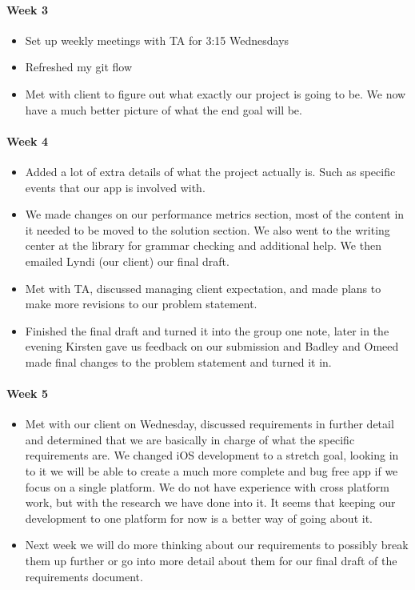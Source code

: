 \documentclass[onecolumn, draftclsnofoot,10pt, compsoc]{IEEEtran}
\begin{document}
      \paragraph{Week 3}
        \begin{itemize}
          \item Set up weekly meetings with TA for 3:15 Wednesdays
          \item Refreshed my git flow
          \item Met with client to figure out what exactly our project is going to be. We now have a much better picture of what the end goal will be.
        \end{itemize}

      \paragraph{Week 4}
        \begin{itemize}
          \item Added a lot of extra details of what the project actually is. Such as specific events that our app is involved with.
          \item We made changes on our performance metrics section, most of the content in it needed to be moved to the solution section. We also went to the writing center at the library for grammar checking and additional help. We then emailed Lyndi (our client) our final draft.
          \item Met with TA, discussed managing client expectation, and made plans to make more revisions to our problem statement.
          \item Finished the final draft and turned it into the group one note, later in the evening Kirsten gave us feedback on our submission and Badley and Omeed made final changes to the problem statement and turned it in.
        \end{itemize}

      \paragraph{Week 5}
        \begin{itemize}
          \item Met with our client on Wednesday, discussed requirements in further detail and determined that we are basically in charge of what the specific requirements are. We changed iOS development to a stretch goal, looking in to it we will be able to create a much more complete and bug free app if we focus on a single platform. We do not have experience with cross platform work, but with the research we have done into it. It seems that keeping our development to one platform for now is a better way of going about it.
          \item Next week we will do more thinking about our requirements to possibly break them up further or go into more detail about them for our final draft of the requirements document.
        \end{itemize}
\end{document}
